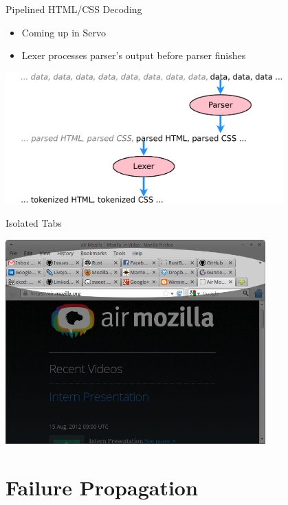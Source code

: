 \documentclass[xcolor=dvipsnames]{beamer}
\begin{document}
\begin{frame}{Pipelined HTML/CSS Decoding}
	\begin{itemize}
		\item Coming up in Servo
		\item Lexer processes parser's output before parser finishes
	\end{itemize}
	\linegap
	\begin{center}
	\includegraphics[width=0.8\textwidth]{parselex.png}
	\end{center}
\end{frame}
\begin{frame}{Isolated Tabs}
	\begin{center}
	\includegraphics[width=0.75\textwidth]{manytabs.png}
	\end{center}
\end{frame}

\section{Failure Propagation}
\end{document}
